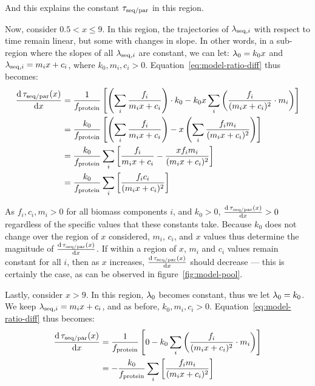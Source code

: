 And this explains the constant $\tau_{\mathrm{seq}/\mathrm{par}}$ in this region.

Now, consider $0.5 < x \leq 9$.
In this region, the trajectories of $\lambda_{\mathrm{seq},i}$ with respect to time remain linear, but some with changes in slope.
In other words, in a sub-region where the slopes of all $\lambda_{\mathrm{seq},i}$ are constant, we can let: $\lambda_{0} = k_{0}x$ and $\lambda_{\mathrm{seq},i} = m_{i}x + c_{i}$, where $k_{0}, m_{i}, c_{i} > 0$.
Equation~\ref{eq:model-ratio-diff} thus becomes:
\begin{equation}
  \begin{aligned}
  \frac{\mathrm{d} \, \tau_{\mathrm{seq}/\mathrm{par}}(x)}{\mathrm{d} x} &= \frac{1}{f_{\mathrm{protein}}} \left[ \left( \sum_i \frac{f_i}{m_{i}x+c_{i}} \right) \cdot k_{0} - k_{0}x \sum_{i}\left( \frac{f_{i}}{(m_{i}x+c_{i})^{2}} \cdot m_{i} \right) \right]\\
  &= \frac{k_{0}}{f_{\mathrm{protein}}} \left[ \left( \sum_i \frac{f_i}{m_{i}x+c_{i}} \right) - x \left( \sum_{i} \frac{f_{i}m_{i}}{(m_{i}x+c_{i})^{2}} \right) \right]\\
  &= \frac{k_{0}}{f_{\mathrm{protein}}} \sum_{i} \left[ \frac{f_i}{m_{i}x+c_{i}} - \frac{xf_{i}m_{i}}{(m_{i}x+c_{i})^{2}} \right]\\
  &= \frac{k_{0}}{f_{\mathrm{protein}}} \sum_{i} \left[ \frac{f_{i}c_{i}}{(m_{i}x+c_{i})^{2}} \right]
  \end{aligned}
  \label{eq:model-ratio-diff-midx}
\end{equation}

As $f_{i}, c_{i}, m_{i} > 0$ for all biomass components $i$, and $k_{0} > 0$, $\frac{\mathrm{d} \, \tau_{\mathrm{seq}/\mathrm{par}}(x)}{\mathrm{d} x} > 0$ regardless of the specific values that these constants take.
Because $k_{0}$ does not change over the region of $x$ considered, $m_{i}$, $c_{i}$, and $x$ values thus determine the magnitude of $\frac{\mathrm{d} \, \tau_{\mathrm{seq}/\mathrm{par}}(x)}{\mathrm{d} x}$.
If within a region of $x$, $m_{i}$ and $c_{i}$ values remain constant for all $i$, then as $x$ increases, $\frac{\mathrm{d} \, \tau_{\mathrm{seq}/\mathrm{par}}(x)}{\mathrm{d} x}$ should decrease --- this is certainly the case, as can be observed in figure~\ref{fig:model-pool}.

Lastly, consider $x > 9$.
In this region, $\lambda_{0}$ becomes constant, thus we let $\lambda_{0} = k_{0}$.
We keep $\lambda_{\mathrm{seq},i} = m_{i}x + c_{i}$, and as before, $k_{0}, m_{i}, c_{i} > 0$.
Equation~\ref{eq:model-ratio-diff} thus becomes:
\begin{equation}
  \begin{aligned}
  \frac{\mathrm{d} \, \tau_{\mathrm{seq}/\mathrm{par}}(x)}{\mathrm{d} x} &= \frac{1}{f_{\mathrm{protein}}} \left[ 0 - k_{0} \sum_{i}\left( \frac{f_{i}}{(m_{i}x+c_{i})^{2}} \cdot m_{i} \right) \right]\\
  &= -\frac{k_{0}}{f_{\mathrm{protein}}} \sum_{i}\left[ \frac{f_{i}m_{i}}{(m_{i}x+c_{i})^{2}} \right]
  \end{aligned}
  \label{eq:model-ratio-diff-largex}
\end{equation}

